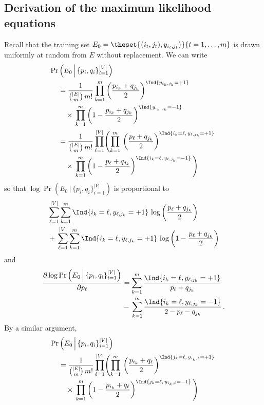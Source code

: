 \subsection{Derivation of the maximum likelihood equations}
%
Recall that the training set
$
	E_0 = \theset{\big(i_t,j_t),y_{i_t,j_t}\big)}{t=1,\dots,m}
$
is drawn uniformly at random from $E$ without replacement. 
We can write
%
\begin{align*}
	\Pr&\left(E_0\,\Big|\, \{p_i, q_i\}_{i=1}^{|V|}\right)\\ 
&= 
	\frac{1}{\binom{|E|}{m}\,m!}\prod_{k=1}^m \left(\frac{p_{i_k}+q_{j_k}}{2} \right)^{\Ind{y_{i_k,j_k}=+1}}\,\\
&\quad\times\,\prod_{k=1}^m\left(1-\frac{p_{i_k}+q_{j_k}}{2} \right)^{\Ind{y_{i_k,j_k}=-1}}\\
&=
\frac{1}{\binom{|E|}{m}\,m!}
\prod_{\ell=1}^{|V|}\Biggl(\prod_{k=1}^m\,
\left(\frac{p_{\ell}+q_{j_k}}{2} \right)^{\Ind{i_k = \ell,\,y_{\ell,j_k}=+1}}\,\\
&\quad\times\,
\prod_{k=1}^m\left(1-\frac{p_{\ell}+q_{j_k}}{2} \right)^{\Ind{i_k = \ell,\,y_{\ell,j_k}=-1}}\Biggl)
\end{align*}
%
so that $\log \Pr\left(E_0\,\Big|\, \{p_i, q_i\}_{i=1}^{|V|}\right)$ is proportional to
%
\begin{align*}
&\sum_{\ell=1}^{|V|}\sum_{k=1}^m \Ind{i_k = \ell,y_{\ell,j_k}=+1}\,
\log\left(\frac{p_{\ell}+q_{j_k}}{2} \right)\,\\
&+\,
\sum_{\ell=1}^{|V|}\sum_{k=1}^m \Ind{i_k = \ell,y_{\ell,j_k}=+1}\, 
\log\left(1-\frac{p_{\ell}+q_{j_k}}{2} \right)
\end{align*}
%
and
%
\begin{align*}
\frac{\partial \log \Pr\left(E_0\,\Big|\, \{p_i, q_i\}_{i=1}^{|V|}\right)}{\partial p_{\ell}}
&= 
\sum_{k=1}^m 
\frac{\Ind{i_k = \ell,y_{\ell,j_k}=+1}}{p_{\ell}+q_{j_k}}\,\\
& - \,
\sum_{k=1}^m \frac{\Ind{i_k = \ell,y_{\ell,j_k}=-1}}{2-p_{\ell}-q_{j_k}}\,.
\end{align*}
%
By a similar argument,
%
\begin{align*}
\Pr&\left(E_0\,\Big|\, \{p_i, q_i\}_{i=1}^{|V|}\right) 
\\ &=
\frac{1}{\binom{|E|}{m}\,m!}
\prod_{\ell=1}^{|V|}\Biggl(\prod_{k=1}^m\,
\left(\frac{p_{i_k}+q_{\ell}}{2} \right)^{\Ind{j_k = \ell,\,y_{i_k,\ell}=+1}}\,\\
&\quad\times\,
\prod_{k=1}^m\left(1-\frac{p_{i_k}+q_{\ell}}{2} \right)^{\Ind{j_k = \ell,\,y_{i_k,\ell}=-1}}\Biggl)
\end{align*}
